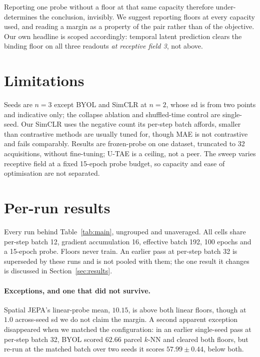 \documentclass{article}
\begin{document}
Reporting one probe without a floor at that same capacity therefore under-determines the conclusion,
invisibly. We suggest reporting floors at every capacity used, and reading a margin as a property of
the pair rather than of the objective. Our own headline is scoped accordingly: temporal latent
prediction clears the binding floor on all three readouts \emph{at receptive field 3}, not above.

\section{Limitations}

Seeds are $n{=}3$ except BYOL and SimCLR at $n{=}2$, whose sd is from two points and indicative
only; the collapse ablation and shuffled-time control are single-seed. Our SimCLR uses the negative
count its per-step batch affords, smaller than contrastive methods are usually tuned for, though MAE
is not contrastive and fails comparably. Results are frozen-probe on
one dataset, truncated to 32 acquisitions, without fine-tuning; U-TAE \citep{garnot2021pastis} is a
ceiling, not a peer. The sweep varies receptive field at a fixed 15-epoch probe
budget, so capacity and ease of optimisation are not separated.




\appendix
\section{Per-run results}
\label{app:runs}

Every run behind Table~\ref{tab:main}, ungrouped and unaveraged. All cells share per-step batch 12,
gradient accumulation 16, effective batch 192, 100 epochs and a 15-epoch probe. Floors never train.
An earlier pass at per-step batch 32 is superseded by these runs and is not pooled with them; the one
result it changes is discussed in Section~\ref{sec:results}.

\paragraph{Exceptions, and one that did not survive.} Spatial JEPA's linear-probe mean, $10.15$, is
above both linear floors, though at $1.0$ across-seed sd we do not claim the margin. A second
apparent exception disappeared when we matched the configuration: in an earlier single-seed pass at
per-step batch 32, BYOL scored $62.66$ parcel $k$-NN and cleared both floors, but re-run at the
matched batch over two seeds it scores $57.99 \pm 0.44$, below both.
\end{document}
